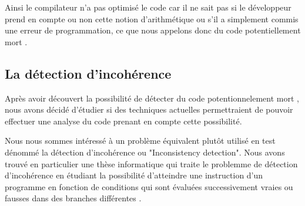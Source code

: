 Ainsi le compilateur n'a pas optimisé le code car il ne sait pas si le développeur prend en compte ou non cette notion d'arithmétique ou s'il a simplement commis une erreur de programmation, ce que nous appelons donc du code \og potentiellement mort \fg{}.

\subsection{La détection d'incohérence}

Après avoir découvert la possibilité de détecter du code \og potentionnelement mort \fg{}, nous avons décidé d'étudier si des techniques actuelles permettraient de pouvoir effectuer une analyse du code prenant en compte cette possibilité.

Nous nous sommes intéressé à un problème équivalent plutôt utilisé en test dénommé la détection d'incohérence ou "Inconsistency detection". Nous avons trouvé en particulier une thèse informatique qui traite le problemme de détection d'incohérence en étudiant la possibilité d'atteindre une instruction d'un programme en fonction de conditions qui sont évaluées successivement vraies ou fausses dans des branches différentes \cite{inconsistencies}.

